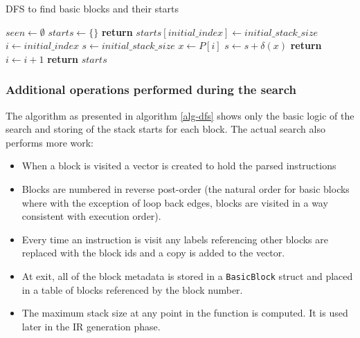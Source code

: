 \begin{algorithm}
      \caption{DFS to find basic blocks and their starts}\label{alg-dfs}
      \begin{algorithmic}[1]
            \State $seen \gets \emptyset$
            \State $starts \gets \{\}$
            \State \textbf{return}
            \EndIf
            \State $starts[initial\_index] \gets initial\_stack\_size$
            \State $i \gets initial\_index$
            \State $s \gets initial\_stack\_size$
            \Repeat
            \State $x \gets P[i]$
            \State $s \gets s + \delta(x)$
            \State {}
            \EndFor
            \State {}
            \EndIf
            \State \textbf{return}
            \EndIf
            \State $i \gets i + 1$
            \EndFunction
            \State {}
            \State \textbf{return} $starts$
            \EndFunction
      \end{algorithmic}
\end{algorithm}

\subsubsection{Additional operations performed during the search} \label{addop}

The algorithm as presented in algorithm \ref{alg-dfs} shows only the basic logic of the search and
storing of the stack starts for each block. The actual search also performs more work:

\begin{itemize}
      \item When a block is visited a vector is created to hold the parsed instructions
      \item Blocks are numbered in reverse post-order (the natural order for basic blocks where
            with the exception of loop back edges, blocks are visited in a way consistent with
            execution order).
      \item Every time an instruction is visit any labels referencing other blocks are replaced
            with the block ids and a copy is added to the vector.
      \item At exit, all of the block metadata is stored in a \texttt{BasicBlock} struct and placed
            in a table of blocks referenced by the block number.
      \item The maximum stack size at any point in the function is computed. It is used later in
            the IR generation phase.
\end{itemize}

